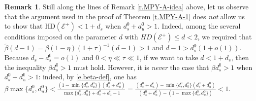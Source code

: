 \documentclass[12pt]{amsart}
\numberwithin{equation}{section}
\theoremstyle{definition}
\newtheorem{remark}[theorem]{Remark}
\newcommand{\<}{{\langle}}
\renewcommand{\>}{{\rangle}}
\begin{document}
\begin{remark}\label{r.expected-dimension-MPY-A} Still along the lines of Remark \ref{r.MPY-A-idea} above, let us observe that the argument used in the proof of Theorem \ref{t.MPY-A-1} does \emph{not} allow us to show that $\textrm{HD}(\mathcal{E}^+)<1+d_s$ when $d_s^0+d_u^0>1$. Indeed, among the several conditions imposed on the parameter $d$ with $HD(\mathcal{E}^+)\leq d<2$, we required that $\widetilde{\beta}(d-1)=\beta(1-\eta)(1+\tau)^{-1}(d-1)>1$ and $d-1>d_s^0(1+o(1))$. Because $d_s-d_s^0=o(1)$ and $0<\eta\ll\tau\ll1$, if we want to take $d<1+d_s$, then the inequality $\beta d_s^0>1$ must hold. However, it is \emph{never} the case that $\beta d_s^0>1$ when $d_s^0+d_u^0>1$: indeed, by \eqref{e.beta-def}, one has $\beta \max\{d_s^0,d_u^0\}<\frac{(1-\min\{d_s^0,d_u^0\})(d_s^0+d_u^0)}{\max\{d_s^0,d_u^0\}+d_s^0+d_u^0-1} = \frac{(d_s^0+d_u^0)-\min\{d_s^0,d_0^u\}(d_s^0+d_u^0)}{(d_s^0+d_u^0)-(1-\max\{d_s^0,d_u^0\})}<1$. 
\end{remark}
\end{document}

